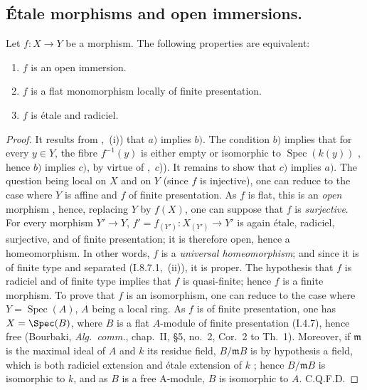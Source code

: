 \subsection{\'Etale morphisms and open immersions.}
\label{subsection:IV.17.9}
\label{IV.17.9}

\begin{theorem}[17.9.1]
\label{IV.17.9.1}
Let $f:X\to Y$ be a morphism.
The following properties are equivalent:
\begin{enumerate}
  \item[a)] $f$ is an open immersion.
  \item[b)] $f$ is a flat monomorphism locally of finite presentation.
  \item[c)] $f$ is \'etale and radiciel.
\end{enumerate}
\end{theorem}

\begin{proof}
It results from ,~(i)) that $a)$ implies $b)$.
The condition $b)$ implies that for every $y\in Y$, the fibre $f^{-1}(y)$ is either empty or isomorphic to $\operatorname{Spec}(k(y))$ , hence $b)$ implies $c)$, by virtue of ,~$c$)).
It remains to show that $c)$ implies $a)$.
The question being local on $X$ and on $Y$ (since $f$ is injective), one can reduce to the case where $Y$ is affine and $f$ of finite presentation.
As $f$ is flat, this is an \emph{open} morphism , hence, replacing $Y$ by $f(X)$, one can suppose that $f$ is \emph{surjective}.
For every morphism $Y'\to Y$, $f'=f_{(Y')}:X_{(Y')}\to Y'$ is again \'etale, radiciel, surjective, and of finite presentation; it is therefore open, hence a homeomorphism.
In other words, $f$ is a \emph{universal homeomorphism}; and since it is of finite type and separated (I.8.7.1,~(ii)), it is proper.
The hypothesis that $f$ is radiciel and of finite type implies that $f$ is quasi-finite; hence  $f$ is a finite morphism.
To prove that $f$ is an isomorphism, one can reduce to the case where $Y=\operatorname{Spec}(A)$, $A$ being a local ring.
As $f$ is of finite presentation, one has $X=\Spec(B)$, where $B$ is a flat $A$-module of finite presentation (I.4.7), hence free (Bourbaki, \emph{Alg.~comm.}, chap.~II, \S5, no.~2, Cor.~2 to Th.~1).
Moreover, if $\mathfrak{m}$ is the maximal ideal of $A$ and $k$ its residue field, $B/\mathfrak{m}B$ is by hypothesis a field, which is both radiciel extension and \'etale extension of $k$ ; hence $B/\mathfrak{m}B$ is isomorphic to $k$, and as $B$ is a free A-module, $B$ is isomorphic to $A$.
C.Q.F.D.
\end{proof}

